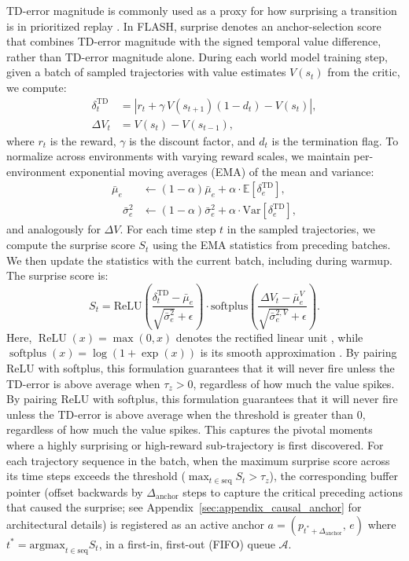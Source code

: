 \documentclass{article} %
\begin{document}
TD-error magnitude is commonly used as a proxy for how surprising a transition is in prioritized replay \citep{schaul2015prioritized}. In FLASH, surprise denotes an anchor-selection score that combines TD-error magnitude with the signed temporal value difference, rather than TD-error magnitude alone. During each world model training step, given a batch of sampled trajectories with value estimates $V(s_t)$ from the critic, we compute:
\begin{align}
\delta_t^{\text{TD}} &= \left| r_t + \gamma \, V(s_{t+1})(1 - d_t) - V(s_t) \right|, \label{eq:td_error} \\
\Delta V_t &= V(s_t) - V(s_{t-1}), \label{eq:value_diff}
\end{align}
where $r_t$ is the reward, $\gamma$ is the discount factor, and $d_t$ is the termination flag. To normalize across environments with varying reward scales, we maintain per-environment exponential moving averages (EMA) of the mean and variance:
\begin{align}
\bar{\mu}_e &\leftarrow (1-\alpha)\bar{\mu}_e + \alpha \cdot \mathbb{E}[\delta^{\text{TD}}_{e}], \\
\quad
\bar{\sigma}^2_e &\leftarrow (1-\alpha)\bar{\sigma}^2_e + \alpha \cdot \text{Var}[\delta^{\text{TD}}_{e}], \label{eq:ema_update}
\end{align}
and analogously for $\Delta V$. For each time step $t$ in the sampled trajectories, we compute the surprise score $S_t$ using the EMA statistics from preceding batches. We then update the statistics with the current batch, including during warmup. The surprise score is:
\begin{equation}
S_t = \text{ReLU}\!\left(\frac{\delta^{\text{TD}}_t - \bar{\mu}_e}{\sqrt{\bar{\sigma}^2_e} + \epsilon}\right) \cdot \text{softplus}\!\left(\frac{\Delta V_t - \bar{\mu}^{V}_e}{\sqrt{\bar{\sigma}^{2,V}_e} + \epsilon}\right).
\label{eq:surprise}
\end{equation}
Here, $\operatorname{ReLU}(x)=\max(0,x)$ denotes the rectified linear unit \citep{nair2010rectified}, while $\operatorname{softplus}(x)=\log(1+\exp(x))$ is its smooth approximation \citep{dugas2000incorporating}. By pairing ReLU with softplus, this formulation guarantees that it will never fire unless the TD-error is above average when $\tau_z > 0$, regardless of how much the value spikes. By pairing ReLU with softplus, this formulation guarantees that it will never fire unless the TD-error is above average when the threshold is greater than 0, regardless of how much the value spikes. This captures the pivotal moments where a highly surprising or high-reward sub-trajectory is first discovered. For each trajectory sequence in the batch, when the maximum surprise score across its time steps exceeds the threshold ($\max_{t \in \text{seq}} S_t > \tau_z$), the corresponding buffer pointer (offset backwards by $\Delta_{\text{anchor}}$ steps to capture the critical preceding actions that caused the surprise; see Appendix~\ref{sec:appendix_causal_anchor} for architectural details) is registered as an active anchor $a = (p_{t^*+\Delta_\text{anchor}},\, e)$ where $t^* = \text{argmax}_{t \in \text{seq}} S_t$, in a first-in, first-out (FIFO) queue $\mathcal{A}$.
\end{document}
